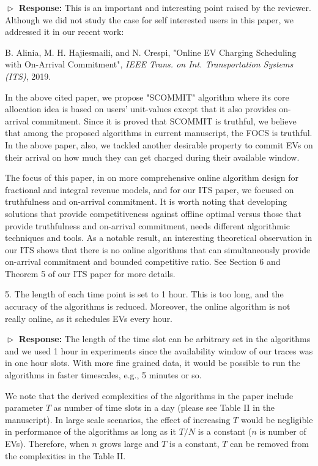 \documentclass[11pt]{article}
\begin{document}
$\vartriangleright$ \noindent\textbf{Response:} 
This is an important and interesting point raised by the reviewer. Although we did not study the case for self interested users in this paper, we addressed it in our recent work: 

B. Alinia, M. H. Hajiesmaili, and N. Crespi, "Online EV Charging Scheduling with On-Arrival Commitment", \textit{IEEE Trans. on Int. Transportation Systems (ITS)}, 2019.

In the above cited paper, we propose "SCOMMIT" algorithm where its core allocation idea is based on users' unit-values except that it also provides on-arrival commitment. Since it is proved that SCOMMIT is truthful, we believe that among the proposed algorithms in current manuscript, the FOCS is truthful. In the above paper, also, we tackled another desirable property to commit EVs on their arrival on how much they can get charged during their available window. 

The focus of this paper, in on more comprehensive online algorithm design for fractional and integral revenue models, and for our ITS paper, we focused on truthfulness and on-arrival commitment. It is worth noting that developing solutions that provide competitiveness against offline optimal versus those that provide truthfulness and on-arrival commitment, needs different algorithmic techniques and tools. As a notable result, an interesting theoretical observation in our ITS shows that there is no online algorithms that can simultaneously provide on-arrival commitment and bounded competitive ratio. See Section 6 and Theorem 5 of our ITS paper for more details. 

\vspace{3mm}
{\color{blue} 5. The length of each time point is set to 1 hour. This is too long, and the accuracy of the algorithms is reduced. Moreover, the online algorithm is not really online, as it schedules EVs every hour. }
\vspace{3mm}

$\vartriangleright$ \noindent\textbf{Response:} 
The length of the time slot can be arbitrary set in the algorithms and we used 1 hour in experiments since the availability window of our traces was in one hour slots. With more fine grained data, it would be possible to run the algorithms in faster timescales, e.g., 5 minutes or so. 

We note that the derived complexities of the algorithms in the paper include parameter $T$ as number of time slots in a day (please see Table II in the manuscript). In large scale scenarios, the effect of increasing $T$ would be negligible in performance of the algorithms as long as it $T/N$ is a constant ($n$ is number of EVs). Therefore, when $n$ grows large and $T$ is a constant, $T$ can be removed from the complexities in the Table II. 
\end{document}
